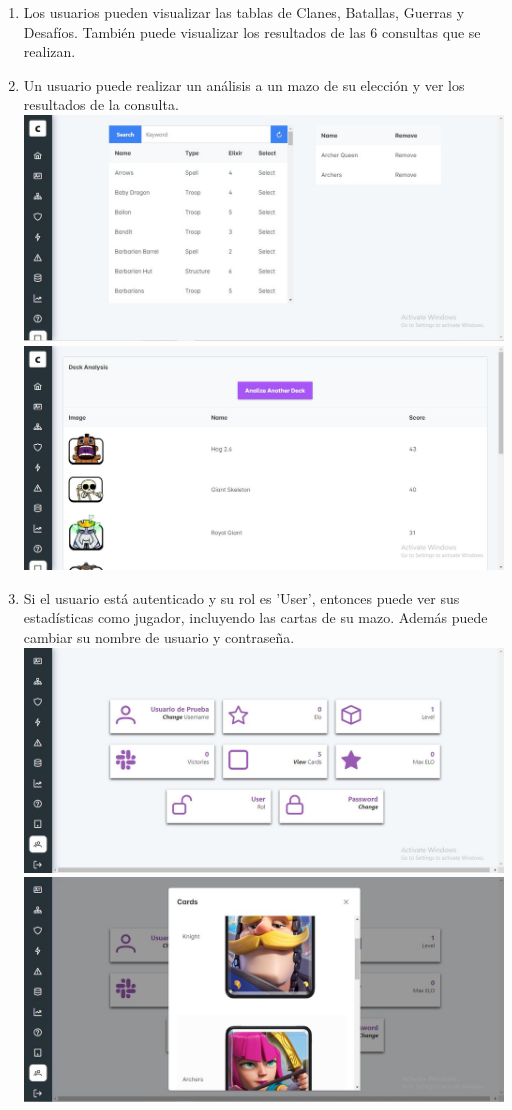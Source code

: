 \documentclass[15pt,a4paper]{article}
\begin{document}
\begin{enumerate}
    \item Los usuarios pueden visualizar las tablas de Clanes, Batallas, Guerras y Desafíos. También puede visualizar los resultados de las 6 consultas que se realizan.
    \item Un usuario puede realizar un análisis a un mazo de su elección y ver los resultados de la consulta.
    \includegraphics[width=1\textwidth]{anal1}
    \includegraphics[width=1\textwidth]{anal2}

    \item Si el usuario está autenticado y su rol es 'User', entonces puede ver sus estadísticas como jugador, incluyendo las cartas de su mazo. Además puede cambiar su nombre de usuario y contraseña.
    \includegraphics[width=1\textwidth]{user}
    \includegraphics[width=1\textwidth]{mazo}


\end{enumerate}
\end{document}

